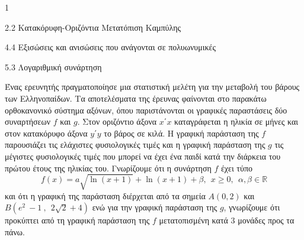 \begin{ylh}{1}
\item 2.2 Κατακόρυφη-Οριζόντια Μετατόπιση Καμπύλης
\item 4.4 Εξισώσεις και ανισώσεις που ανάγονται σε πολυωνυμικές
\item 5.3 Λογαριθμική συνάρτηση
\end{ylh}
Ένας ερευνητής πραγματοποίησε μια στατιστική μελέτη για την μεταβολή του βάρους των Ελληνοπαίδων. Τα αποτελέσματα της έρευνας φαίνονται στο παρακάτω ορθοκανονικό σύστημα αξόνων, όπου παριστάνονται οι γραφικές παραστάσεις δύο συναρτήσεων $f$ και $g$. Στον οριζόντιο άξονα $x΄x$ καταγράφεται η ηλικία σε μήνες και στον κατακόρυφο άξονα $y΄y$ το βάρος σε κιλά. H γραφική παράσταση της $f$ παρουσιάζει τις ελάχιστες φυσιολογικές
τιμές και η γραφική παράσταση της $g$ τις μέγιστες φυσιολογικές τιμές που μπορεί να έχει ένα παιδί κατά την διάρκεια του πρώτου έτους της ηλικίας του.
Γνωρίζουμε ότι η συνάρτηση $f$ έχει τύπο
\begin{equation*}f(x) = a\sqrt{\ln(x + 1)} + \ln(x + 1) + \beta,\ \ x \geq 0,\ \ \alpha,\beta\mathbb{\in R}\end{equation*}
και ότι η γραφική της παράσταση διέρχεται από τα σημεία $A(0,2)$ και $B(e^{2}\  - 1\ ,\ \ 2\sqrt{2} + 4)$ ενώ για την γραφική παράσταση της $g$, γνωρίζουμε ότι προκύπτει από τη γραφική παράσταση της $f$ μετατοπισμένη κατά $3$ μονάδες προς τα πάνω.
\begin{center}
\end{center}
